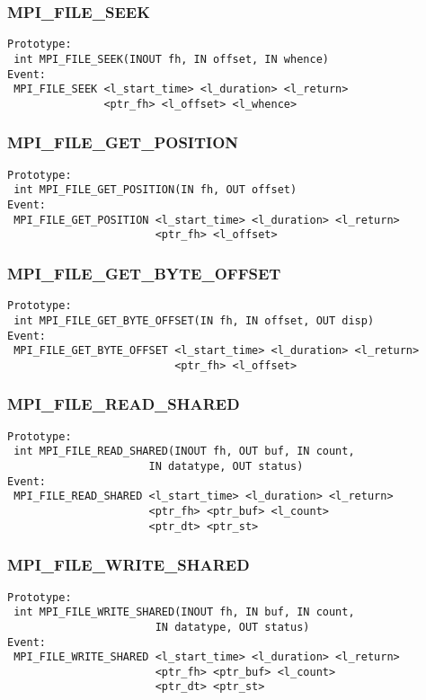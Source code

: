 \documentclass[9pt]{article}
\begin{document}
\subsubsection{MPI\_FILE\_SEEK}
\label{sec:MPIFILESEEK}
\begin{verbatim}
Prototype:
 int MPI_FILE_SEEK(INOUT fh, IN offset, IN whence)
Event:
 MPI_FILE_SEEK <l_start_time> <l_duration> <l_return>
               <ptr_fh> <l_offset> <l_whence>
\end{verbatim}

\subsubsection{MPI\_FILE\_GET\_POSITION}
\label{sec:MPIFILEGETPOSITION}
\begin{verbatim}
Prototype:
 int MPI_FILE_GET_POSITION(IN fh, OUT offset)
Event:
 MPI_FILE_GET_POSITION <l_start_time> <l_duration> <l_return>
                       <ptr_fh> <l_offset>
\end{verbatim}

\subsubsection{MPI\_FILE\_GET\_BYTE\_OFFSET}
\label{sec:MPIFILEGETBYTEOFFSET}
\begin{verbatim}
Prototype:
 int MPI_FILE_GET_BYTE_OFFSET(IN fh, IN offset, OUT disp)
Event:
 MPI_FILE_GET_BYTE_OFFSET <l_start_time> <l_duration> <l_return>
                          <ptr_fh> <l_offset>
\end{verbatim}

\subsubsection{MPI\_FILE\_READ\_SHARED}
\label{sec:MPIFILEREADSHARED}
\begin{verbatim}
Prototype:
 int MPI_FILE_READ_SHARED(INOUT fh, OUT buf, IN count, 
                      IN datatype, OUT status)
Event:
 MPI_FILE_READ_SHARED <l_start_time> <l_duration> <l_return>
                      <ptr_fh> <ptr_buf> <l_count>
                      <ptr_dt> <ptr_st>
\end{verbatim}

\subsubsection{MPI\_FILE\_WRITE\_SHARED}
\label{sec:MPIFILEWRITESHARED}
\begin{verbatim}
Prototype:
 int MPI_FILE_WRITE_SHARED(INOUT fh, IN buf, IN count, 
                       IN datatype, OUT status)
Event:
 MPI_FILE_WRITE_SHARED <l_start_time> <l_duration> <l_return>
                       <ptr_fh> <ptr_buf> <l_count>
                       <ptr_dt> <ptr_st>
\end{verbatim}
\end{document}
